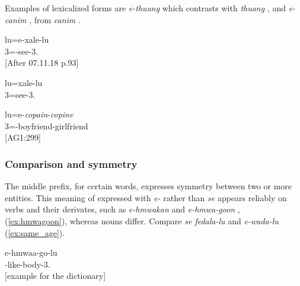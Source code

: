 Examples of lexicalized forms are \textit{e-thuang}  which contrasts with \textit{thuang} , and \textit{e-canim} , from \textit{canim} .


	
	\ea\label{ex:refl3}
	\gll lu=e-xale-lu\\ 
	 3=-see-3.\\ 
	\glt {} {[After 07.11.18 p.93]}
	\z
	
	\ea
	\gll lu=xale-lu\\ 
	 3=see-3.\\ 
	\glt {}
	\z

\ea\label{ex:refl3c}
\gll lu=e-\textit{copain}-\textit{copine}\\ 
 3=-boyfriend-girlfriend\\ 
\glt {} {[AG1:299]}
\z



%
\subsubsection{Comparison and symmetry}
\label{ssec:MID_comparison}

The middle prefix, for certain words, expresses symmetry between two or more entities. 
This meaning of  expressed with \textit{e-}  rather than \textit{se}  appears reliably on verbs and their derivates, such as \textit{e-hmwakan}   and \textit{e-hmwa-goon} ,  (\ref{ex:hmwagoon}), whereas nouns differ. Compare \textit{se fedala-lu}  and \textit{e-wada-lu}  (\ref{ex:same_age}).

\ea \label{ex:hmwagoon}
\gll e-hmwaa-go-lu\\ 
 -like-body-3.\\ 
\glt {} {[example for the dictionary]}
\z
%

